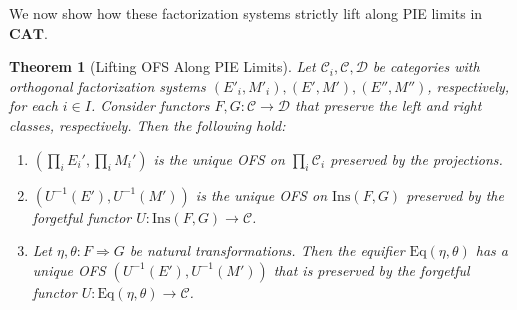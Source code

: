 \documentclass[11pt]{article}
\theoremstyle{plain}
\newtheorem{theorem}{Theorem}[section]
\theoremstyle{definition}
\numberwithin{equation}{section}
\newcommand{\C}{\mathcal{C}}
\newcommand{\D}{\mathcal{D}}
\newcommand{\CAT}{\mathbf{CAT}}
\newcommand{\Ins}{\mathrm{Ins}}
\newcommand{\Eq}{\mathrm{Eq}}
\begin{document}
We now show how these factorization systems strictly lift along PIE limits in $\CAT$.

\begin{theorem}[Lifting OFS Along PIE Limits]\label{thm:pie_ofs_creation}
   Let $\C_i,\C,\D$ be categories with orthogonal factorization systems $(E'_i,M'_i), (E',M'), (E'',M'')$, respectively, for each $i\in I$. Consider functors $F,G\colon \C\to \D$ that preserve the left and right classes, respectively. Then the following hold:
   \begin{enumerate}
       \item $(\prod_iE_i',\prod_i M_i')$ is the unique OFS on $\prod_i \C_i$ preserved by the projections.
       \item $(U^{-1}(E'),U^{-1}(M'))$ is the unique OFS on $\Ins(F,G)$ preserved by the forgetful functor $U\colon \Ins(F,G)\to \C$.
       \item Let $\eta,\theta\colon F\Rightarrow G$ be natural transformations. Then the equifier $\Eq(\eta,\theta)$ has a unique OFS $(U^{-1}(E'), U^{-1}(M'))$ that is preserved by the forgetful functor $U\colon \Eq(\eta,\theta)\to \C$.
   \end{enumerate}
\end{theorem}
\end{document}
